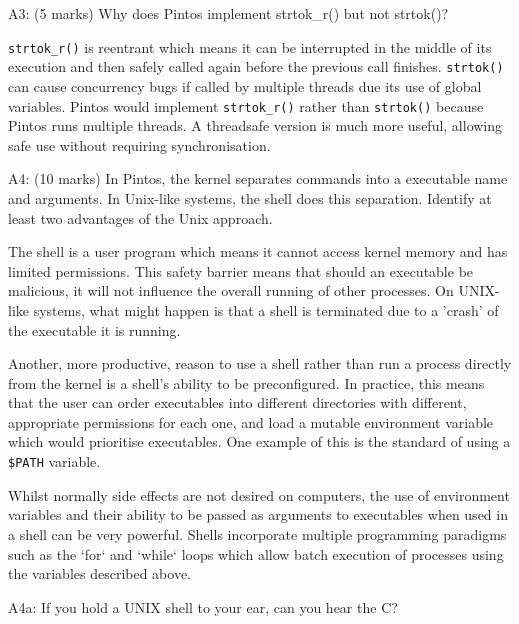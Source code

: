 \noindent A3: (5 marks)
Why does Pintos implement strtok\_r() but not strtok()?


\texttt{strtok\_r()} is reentrant which means it can be interrupted in the middle of its execution and then safely called again before the previous call finishes. \texttt{strtok()} can cause concurrency bugs if called by multiple threads due its use of global variables. Pintos would implement \texttt{strtok\_r()} rather than \texttt{strtok()} because Pintos runs multiple threads. A threadsafe version is much more useful, allowing safe use without requiring synchronisation.


\noindent A4: (10 marks)
In Pintos, the kernel separates commands into a executable name
and arguments.  In Unix-like systems, the shell does this
separation.  Identify at least two advantages of the Unix approach.


The shell is a user program which means it cannot access kernel memory and has limited permissions. This safety barrier means that should an executable be malicious, it will not influence the overall running of other processes. On UNIX-like systems, what might happen is that a shell is terminated due to a 'crash' of the executable it is running.

Another, more productive, reason to use a shell rather than run a process directly from the kernel is a shell's ability to be preconfigured. In practice, this means that the user can order executables into different directories with different, appropriate permissions for each one, and load a mutable environment variable which would prioritise executables. One example of this is the standard of using a \texttt{\$PATH} variable.

Whilst normally side effects are not desired on computers, the use of environment variables and their ability to be passed as arguments to executables when used in a shell can be very powerful. Shells incorporate multiple programming paradigms such as the `for` and `while` loops which allow batch execution of processes using the variables described above.


\noindent A4a: If you hold a UNIX shell to your ear, can you hear the C?




